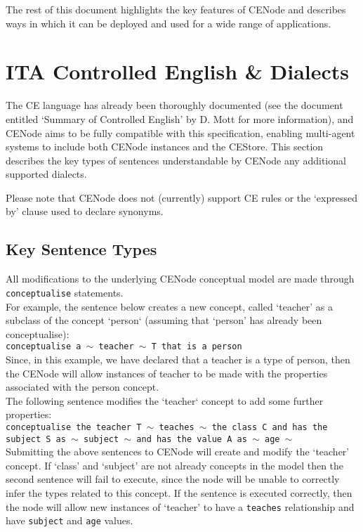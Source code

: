 \documentclass{article}
\begin{document}
The rest of this document highlights the key features of CENode and describes ways in which it can be deployed and used for a wide range of applications.

\section{ITA Controlled English \& Dialects}
The CE language has already been thoroughly documented (see the document entitled `Summary of Controlled English' by D. Mott for more information), and CENode aims to be fully compatible with this specification, enabling multi-agent systems to include both CENode instances and the CEStore. This section describes the key types of sentences understandable by CENode any additional supported dialects.

Please note that CENode does not (currently) support CE rules or the `expressed by' clause used to declare synonyms.

\subsection{Key Sentence Types}
All modifications to the underlying CENode conceptual model are made through \texttt{conceptualise} statements.\\

For example, the sentence below creates a new concept, called `teacher' as a subclass of the concept `person` (assuming that `person' has already been conceptualise):\\
\texttt{conceptualise a $\sim$ teacher $\sim$ T that is a person}\\

Since, in this example, we have declared that a teacher is a type of person, then the CENode will allow instances of teacher to be made with the properties associated with the person concept.\\ 

The following sentence modifies the `teacher` concept to add some further properties:\\
\texttt{conceptualise the teacher T $\sim$ teaches $\sim$ the class C and has the subject S as $\sim$ subject $\sim$ and has the value A as $\sim$ age $\sim$}\\

Submitting the above sentences to CENode will create and modify the `teacher' concept. If `class' and `subject' are not already concepts in the model then the second sentence will fail to execute, since the node will be unable to correctly infer the types related to this concept. If the sentence is executed correctly, then the node will allow new instances of `teacher' to have a \texttt{teaches} relationship and have \texttt{subject} and \texttt{age} values.\\
\end{document}
